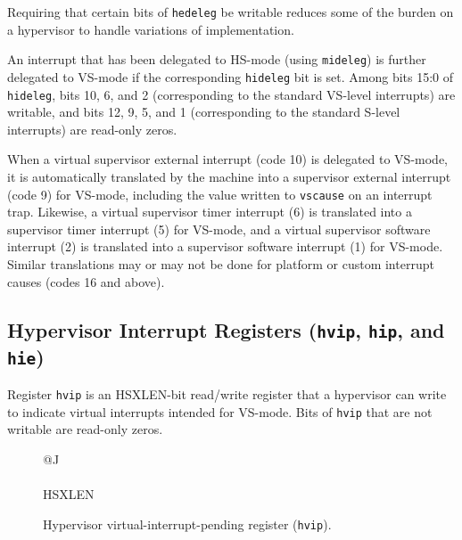 \begin{commentary}
Requiring that certain bits of {\tt hedeleg} be writable reduces some of
the burden on a hypervisor to handle variations of implementation.
\end{commentary}

An interrupt that has been delegated to HS-mode (using {\tt mideleg}) is
further delegated to VS-mode if the corresponding {\tt hideleg} bit is
set.
Among bits 15:0 of {\tt hideleg}, bits 10, 6, and 2 (corresponding
to the standard VS-level interrupts) are writable, and bits 12, 9, 5,
and 1 (corresponding to the standard S-level interrupts) are read-only
zeros.

When a virtual supervisor external interrupt (code 10) is delegated to
VS-mode, it is automatically translated by the machine into a supervisor
external interrupt (code 9) for VS-mode, including the value written to
{\tt vscause} on an interrupt trap.
Likewise, a virtual supervisor timer interrupt (6) is translated into a
supervisor timer interrupt (5) for VS-mode, and a virtual supervisor
software interrupt (2) is translated into a supervisor software interrupt
(1) for VS-mode.
Similar translations may or may not be done for platform or custom
interrupt causes (codes 16 and above).

\subsection{Hypervisor Interrupt Registers ({\tt hvip}, {\tt hip}, and {\tt hie})}
\label{sec:hinterruptregs}

Register {\tt hvip} is an HSXLEN-bit read/write register that a
hypervisor can write to indicate virtual interrupts intended for VS-mode.
Bits of {\tt hvip} that are not writable are read-only zeros.

\begin{figure}[h!]
{\footnotesize
\begin{center}
\begin{tabular}{@{}J}
 \\
\hline
{} \\
\hline
HSXLEN \\
\end{tabular}
\end{center}
}
\vspace{-0.1in}
\caption{Hypervisor virtual-interrupt-pending register ({\tt hvip}).}
\label{hvipreg}
\end{figure}

